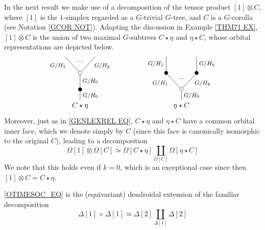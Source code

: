 \documentclass[a4paper,10pt
 ,draft
]{article}%
\begin{document}
In the next result we make use of a decomposition of the tensor product $[1] \otimes C$,
where $[1]$ is the $1$-simplex regarded as a $G$-trivial $G$-tree, and $C$ is a $G$-corolla 
(see Notation \ref{GCOR NOT}). Adapting the discussion
in Example \ref{THM71 EX}, $[1] \otimes C$ is the union of two maximal $G$-subtrees $C \star \eta$ and $\eta \star C$,
whose orbital representations are depicted below.
\begin{equation}\label{OTIMESDECOMP EQ}
\begin{tikzpicture}
[grow=up,auto,level distance=2.3em,every node/.style = {font=\footnotesize},dummy/.style={circle,draw,inner sep=0pt,minimum size=1.75mm}]
	\node at (0,0) [font=\normalsize] {$C \star \eta$}
		child{node [dummy,fill=black] {}
			child{node [dummy] {}
				child{
				edge from parent node [swap,near end] {$G/H_k$} node [name=Kn] {}}
				child{
				edge from parent node [near end] {$G/H_1$}
node [name=Kone,swap] {}}
			edge from parent node [swap] {$G/H_0$}}
		edge from parent node [swap] {$G/H_0$}};
		\draw [dotted,thick] (Kone) -- (Kn) ;
	\node at (5,0) [font=\normalsize] {$\eta \star C$}
		child{node [dummy] {}
			child{node [dummy,fill=black] {}
				child{
				edge from parent node [swap] {$G/H_k$}}
			edge from parent node [swap,near end] {$G/H_k$} node [name=Kn] {}}
			child{node [dummy,fill=black] {}
				child{
				edge from parent node {$G/H_1$}}
			edge from parent node [near end] {$G/H_1$}
node [name=Kone,swap] {}}
		edge from parent node [swap] {$G/H_0$}
		};
		\draw [dotted,thick] (Kone) -- (Kn) ;
\end{tikzpicture}
\end{equation}
Moreover, just as in \eqref{GENLEXREL EQ}, 
$C \star \eta$ and $\eta \star C$ have a common orbital inner face, which we denote simply by $C$
(since this face is canonically isomorphic to the original $C$),
leading to a decomposition
\begin{equation}
      \label{OTIMESOC_EQ}
      \Omega[1] \otimes \Omega[C]
      \simeq
      \Omega[C \star \eta] \coprod_{\Omega[C]} \Omega[\eta \star C]
\end{equation}
We note that this holds even if $k=0$, 
which is an exceptional case since then
$[1] \otimes C = C \star \eta$.

\begin{remark}
\eqref{OTIMESOC_EQ} is the (equivariant) dendroidal extension of the familiar 
decomposition
      \[
            \Delta[1] \times \Delta[1] \simeq \Delta[2] \coprod_{\Delta[1]} \Delta[2]
      \]
\end{remark}
\end{document}
